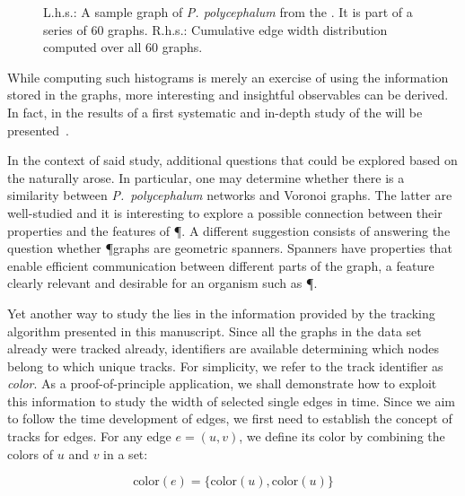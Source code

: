 	\begin{figure}[!htp]
		\centering
		\qquad
		\caption[Demo: How to compute an observable across an entire series of graphs.]{L.h.s.: A sample graph of \emph{P. polycephalum} from the \data. It is part of a series of $60$ graphs. R.h.s.: Cumulative edge width distribution computed over all $60$ graphs.}
    \end{figure}


	While computing such histograms is merely an exercise of using the information stored in the graphs, more interesting and insightful observables can be derived. In fact, in  the results of a first systematic and in-depth study of the \data will be presented~\cite{dirnberger2016}.

	In the context of said study, additional questions that could be explored based on the \data naturally arose. In particular, one may determine whether there is a similarity between \emph{P.~polycephalum} networks and Voronoi graphs. The latter are well-studied and it is interesting to explore a possible connection between their properties and the features of \P. A different suggestion consists of answering the question whether \P graphs are geometric spanners. Spanners have properties that enable efficient communication between different parts of the graph, a feature clearly relevant and desirable for an organism such as \P.

	Yet another way to study the \data lies in the information provided by the tracking algorithm presented in this manuscript.	Since all the graphs in the data set already were tracked already, identifiers are available determining which nodes belong to which unique tracks. For simplicity, we refer to the track identifier as \emph{color}. As a proof-of-principle application, we shall demonstrate how to exploit this information to study the width of selected single edges in time. Since we aim to follow the time development of edges, we first need to establish the concept of tracks for edges. For any edge $e = (u,v)$, we define its color by combining the colors of $u$ and $v$ in a set:

	\begin{equation}
		\text{color}(e) = \{\text{color}(u), \text{color}(u)\}
	\end{equation}

